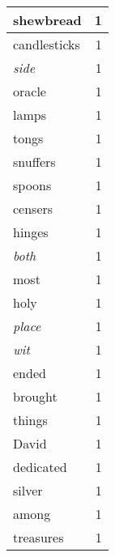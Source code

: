 \begin{center}
\begin{longtable}{l|r}
shewbread & 1 \\ \hline
candlesticks & 1 \\ \hline
\emph{side} & 1 \\ \hline
oracle & 1 \\ \hline
lamps & 1 \\ \hline
tongs & 1 \\ \hline
snuffers & 1 \\ \hline
spoons & 1 \\ \hline
censers & 1 \\ \hline
hinges & 1 \\ \hline
\emph{both} & 1 \\ \hline
most & 1 \\ \hline
holy & 1 \\ \hline
\emph{place} & 1 \\ \hline
\emph{wit} & 1 \\ \hline
ended & 1 \\ \hline
brought & 1 \\ \hline
things & 1 \\ \hline
David & 1 \\ \hline
dedicated & 1 \\ \hline
silver & 1 \\ \hline
among & 1 \\ \hline
treasures & 1 \\ \hline
\end{longtable}
\end{center}



\normalsize



